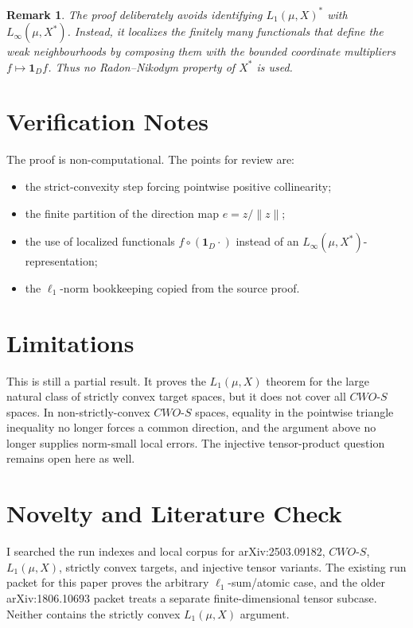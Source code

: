 \documentclass[11pt]{article}
\newtheorem{remark}{Remark}
\newcommand{\CWOS}{\textit{CWO-S}}
\newcommand{\one}{\mathbf 1}
\begin{document}
\begin{remark}
The proof deliberately avoids identifying \(L_1(\mu,X)^*\) with
\(L_\infty(\mu,X^*)\).  Instead, it localizes the finitely many functionals
that define the weak neighbourhoods by composing them with the bounded
coordinate multipliers \(f\mapsto\one_D f\).  Thus no Radon--Nikodym property
of \(X^*\) is used.
\end{remark}

\section*{Verification Notes}

The proof is non-computational.  The points for review are:
\begin{itemize}
  \item the strict-convexity step forcing pointwise positive collinearity;
  \item the finite partition of the direction map \(e=z/\|z\|\);
  \item the use of localized functionals \(f\circ(\one_D\cdot)\) instead of
        an \(L_\infty(\mu,X^*)\)-representation;
  \item the \(\ell_1\)-norm bookkeeping copied from the source proof.
\end{itemize}

\section*{Limitations}

This is still a partial result.  It proves the \(L_1(\mu,X)\) theorem for the
large natural class of strictly convex target spaces, but it does not cover
all \(\CWOS\) spaces.  In non-strictly-convex \(\CWOS\) spaces, equality in
the pointwise triangle inequality no longer forces a common direction, and the
argument above no longer supplies norm-small local errors.  The injective
tensor-product question remains open here as well.

\section*{Novelty and Literature Check}

I searched the run indexes and local corpus for arXiv:2503.09182, \(\CWOS\),
\(L_1(\mu,X)\), strictly convex targets, and injective tensor variants.  The
existing run packet for this paper proves the arbitrary \(\ell_1\)-sum/atomic
case, and the older arXiv:1806.10693 packet treats a separate finite-dimensional
tensor subcase.  Neither contains the strictly convex \(L_1(\mu,X)\) argument.
\end{document}
